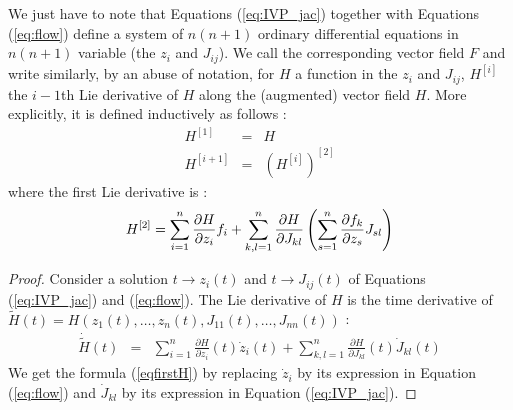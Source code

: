 \documentclass{sig-alternate-05-2015} %
\begin{document}
We just have to note that Equations (\ref{eq:IVP_jac}) together with Equations
(\ref{eq:flow}) define a system of $n(n+1)$ ordinary differential equations in $n(n+1)$
variable (the $z_i$ and $J_{ij}$). We call the corresponding vector field $F$ and
write similarly, by an abuse of notation, for $H$ a function in the $z_i$ and $J_{ij}$,
$H^{[i]}$ the $i-1$th Lie derivative of $H$ along the (augmented) vector field $H$. More
explicitly, it is defined inductively as follows : 
\begin{eqnarray}
H^{[1]} & = & H \\ 
H^{[i+1]} & = & (H^{[i]})^{[2]}
\end{eqnarray}
\noindent where the first Lie derivative is :
\begin{equation}
H^{[2]} = 
\sum\limits_{i=1}^n \frac{\partial H}{\partial z_i} f_i \\
+\sum\limits_{k,l=1}^n \frac{\partial H}{\partial J_{kl}} \left(
\sum\limits_{s=1}^n \frac{\partial f_k}{\partial z_s} J_{sl}\right)
\label{eqfirstH}
\end{equation}

\begin{proof}
Consider a solution $t \rightarrow z_i(t)$ and $t \rightarrow J_{ij}(t)$ of
Equations (\ref{eq:IVP_jac}) and (\ref{eq:flow}). The Lie derivative of $H$
is
the time derivative of $\tilde{H}(t)=H(z_1(t),\ldots,z_n(t),J_{11}(t),\ldots,J_{nn}(t))$ : 
$$\begin{array}{rcl}
\dot{\tilde{H}}(t) & = & \sum\limits_{i=1}^{n} \frac{\partial H}{\partial z_i}(t)
\dot{z}_i(t)+\sum\limits_{k,l=1}^n \frac{\partial H}{\partial J_{kl}}(t) \dot{J}_{kl}(t)
\end{array}$$
We get the formula (\ref{eqfirstH}) by 
replacing $\dot{z}_i$ by its expression in Equation (\ref{eq:flow}) and
$\dot{J}_{kl}$ by its expression in Equation (\ref{eq:IVP_jac}). 
\end{proof}
\end{document}
